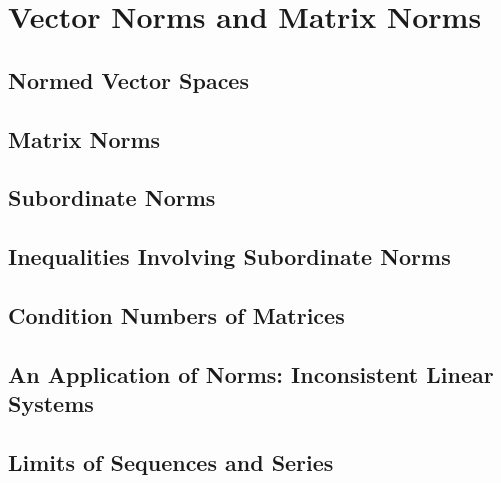 \documentclass[a4paper]{article}
\begin{document}
\newpage
\section{Vector Norms and Matrix Norms}
\subsection{ Normed Vector Spaces} %

\subsection{ Matrix Norms} %

\subsection{ Subordinate Norms} %

\subsection{ Inequalities Involving Subordinate Norms} %

\subsection{ Condition Numbers of Matrices} %

\subsection{ An Application of Norms: Inconsistent Linear Systems} %

\subsection{ Limits of Sequences and Series} %
\end{document}

